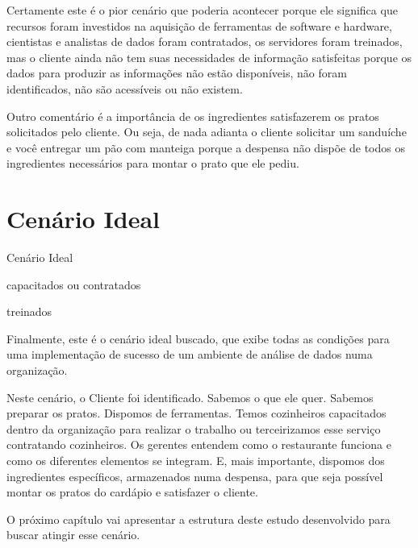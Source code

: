     Certamente este é o pior cenário que poderia acontecer porque ele significa que recursos foram investidos na aquisição de ferramentas de software e hardware, cientistas e analistas de dados foram contratados, os servidores foram treinados, mas o cliente ainda não tem suas necessidades de informação satisfeitas porque os dados para produzir as informações não estão disponíveis, não foram identificados, não são acessíveis ou não existem. 
    
    Outro comentário é a importância de os ingredientes satisfazerem os pratos solicitados pelo cliente. Ou seja, de nada adianta o cliente solicitar um sanduíche e você entregar um pão com manteiga porque a despensa não dispõe de todos os ingredientes necessários para montar o prato que ele pediu. 

\section{Cenário Ideal}
\label{sec-cenarioideal}

    \begin{env-cenario2}{Cenário Ideal}
            \mschecksim \xspace \CLIENTE 
            
            \mschecksim \xspace \CARDAPIO  

            \mschecksim \xspace \LIVRODERECEITAS
            
            \mschecksim \xspace \FOGAO

            \mschecksim \xspace \COZINHEIROS \xspace capacitados ou contratados
        
            \mschecksim \xspace \GERENTES \xspace treinados

            \mschecksim \xspace \DESPENSA

            \mschecksim \xspace \INGREDIENTES
    \end{env-cenario2}

    Finalmente, este é o cenário ideal buscado, que exibe todas as condições para uma implementação de sucesso de um ambiente de análise de dados numa organização.
    
    Neste cenário, o Cliente foi identificado. Sabemos o que ele quer. Sabemos preparar os pratos. Dispomos de ferramentas. Temos cozinheiros capacitados dentro da organização para realizar o trabalho ou terceirizamos esse serviço contratando cozinheiros. Os gerentes entendem como o restaurante funciona e como os diferentes elementos se integram. E, mais importante, dispomos dos ingredientes específicos, armazenados numa despensa, para que seja possível montar os pratos do cardápio e satisfazer o cliente.

    O próximo capítulo vai apresentar a estrutura deste estudo desenvolvido para buscar atingir esse cenário.